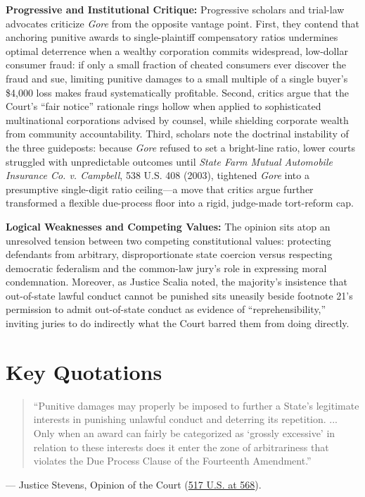 \documentclass[12pt]{article}
\begin{document}
\textbf{Progressive and Institutional Critique:} Progressive scholars and trial-law advocates criticize \textit{Gore} from the opposite vantage point. First, they contend that anchoring punitive awards to single-plaintiff compensatory ratios undermines optimal deterrence when a wealthy corporation commits widespread, low-dollar consumer fraud: if only a small fraction of cheated consumers ever discover the fraud and sue, limiting punitive damages to a small multiple of a single buyer's \$4,000 loss makes fraud systematically profitable. Second, critics argue that the Court's ``fair notice'' rationale rings hollow when applied to sophisticated multinational corporations advised by counsel, while shielding corporate wealth from community accountability. Third, scholars note the doctrinal instability of the three guideposts: because \textit{Gore} refused to set a bright-line ratio, lower courts struggled with unpredictable outcomes until \textit{State Farm Mutual Automobile Insurance Co. v. Campbell}, 538 U.S. 408 (2003), tightened \textit{Gore} into a presumptive single-digit ratio ceiling---a move that critics argue further transformed a flexible due-process floor into a rigid, judge-made tort-reform cap.

\textbf{Logical Weaknesses and Competing Values:} The opinion sits atop an unresolved tension between two competing constitutional values: protecting defendants from arbitrary, disproportionate state coercion versus respecting democratic federalism and the common-law jury's role in expressing moral condemnation. Moreover, as Justice Scalia noted, the majority's insistence that out-of-state lawful conduct cannot be punished sits uneasily beside footnote 21's permission to admit out-of-state conduct as evidence of ``reprehensibility,'' inviting juries to do indirectly what the Court barred them from doing directly.

\section{Key Quotations}

\begin{quote}
``Punitive damages may properly be imposed to further a State's legitimate interests in punishing unlawful conduct and deterring its repetition. ... Only when an award can fairly be categorized as `grossly excessive' in relation to these interests does it enter the zone of arbitrariness that violates the Due Process Clause of the Fourteenth Amendment.''
\end{quote}
\noindent --- Justice Stevens, Opinion of the Court (\href{https://supreme.justia.com/cases/federal/us/517/559/}{517 U.S. at 568}).
\end{document}
